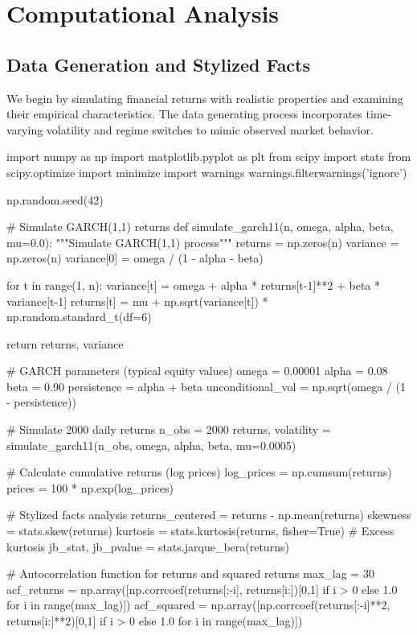 \documentclass[a4paper, 11pt]{article}
\begin{document}
\section{Computational Analysis}

\subsection{Data Generation and Stylized Facts}

We begin by simulating financial returns with realistic properties and examining their
empirical characteristics. The data generating process incorporates time-varying volatility
and regime switches to mimic observed market behavior.

\begin{pycode}
import numpy as np
import matplotlib.pyplot as plt
from scipy import stats
from scipy.optimize import minimize
import warnings
warnings.filterwarnings('ignore')

np.random.seed(42)

# Simulate GARCH(1,1) returns
def simulate_garch11(n, omega, alpha, beta, mu=0.0):
    """Simulate GARCH(1,1) process"""
    returns = np.zeros(n)
    variance = np.zeros(n)
    variance[0] = omega / (1 - alpha - beta)

    for t in range(1, n):
        variance[t] = omega + alpha * returns[t-1]**2 + beta * variance[t-1]
        returns[t] = mu + np.sqrt(variance[t]) * np.random.standard_t(df=6)

    return returns, variance

# GARCH parameters (typical equity values)
omega = 0.00001
alpha = 0.08
beta = 0.90
persistence = alpha + beta
unconditional_vol = np.sqrt(omega / (1 - persistence))

# Simulate 2000 daily returns
n_obs = 2000
returns, volatility = simulate_garch11(n_obs, omega, alpha, beta, mu=0.0005)

# Calculate cumulative returns (log prices)
log_prices = np.cumsum(returns)
prices = 100 * np.exp(log_prices)

# Stylized facts analysis
returns_centered = returns - np.mean(returns)
skewness = stats.skew(returns)
kurtosis = stats.kurtosis(returns, fisher=True)  # Excess kurtosis
jb_stat, jb_pvalue = stats.jarque_bera(returns)

# Autocorrelation function for returns and squared returns
max_lag = 30
acf_returns = np.array([np.corrcoef(returns[:-i], returns[i:])[0,1]
                        if i > 0 else 1.0 for i in range(max_lag)])
acf_squared = np.array([np.corrcoef(returns[:-i]**2, returns[i:]**2)[0,1]
                        if i > 0 else 1.0 for i in range(max_lag)])


\end{pycode}
\end{document}
